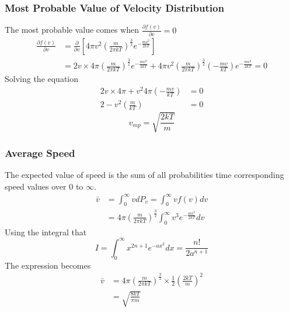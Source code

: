 \documentclass[letterpaper]{article}
\begin{document}
\subsubsection*{Most Probable Value of Velocity Distribution}
The most probable value comes when $\frac{\partial f(v)}{\partial v}=0$
\begin{equation*}
    \begin{aligned}
        \frac{\partial f(v)}{\partial v}&=\frac{\partial}{\partial v}
        [4\pi v^2(\frac{m}{2\pi kT})^{\frac{3}{2}}e^{-\frac{mv^2}{2kT}}]\\
        &=2v\times 4\pi(\frac{m}{2\pi kT})^{\frac{3}{2}}e^{-\frac{mv^2}{2kT}}+
        4\pi v^2(\frac{m}{2\pi kT})^{\frac{3}{2}}(-\frac{mv}{kT})e^{-\frac{mv^2}{2kT}}
        =0
    \end{aligned}
\end{equation*}
Solving the equation
\begin{equation*}
    \begin{aligned}
        2v\times 4\pi + v^2 4\pi(-\frac{mv}{kT})&=0\\
        2-v^2(\frac{m}{kT})&=0
    \end{aligned}
\end{equation*}
\begin{equation*}
    v_{mp}=\sqrt{\frac{2kT}{m}}
\end{equation*}
\subsubsection*{Average Speed}
The expected value of speed is the sum of all probabilities time corresponding
speed values over 0 to $\infty$.
\begin{equation*}
    \begin{aligned}
        \bar{v}&=\int_0^\infty vdP_v=\int_0^\infty vf(v)dv\\
        &=4\pi(\frac{m}{2\pi kT})^\frac{3}{2}\int_0^\infty v^3 e^{-\frac{mv^2}{2kT}}dv
    \end{aligned}
\end{equation*}
Using the integral that
\begin{equation*}
    I=\int_0^\infty x^{2n+1}e^{-ax^2}dx=\frac{n!}{2a^{n+1}}
\end{equation*}
The expression becomes
\begin{equation*}
    \begin{aligned}
        \bar{v}&=4\pi(\frac{m}{2\pi kT})^\frac{3}{2}\times \frac{1}{2}(\frac{2kT}{m})^2\\
        &=\sqrt{\frac{8kT}{\pi m}}
    \end{aligned}
\end{equation*}
\end{document}
